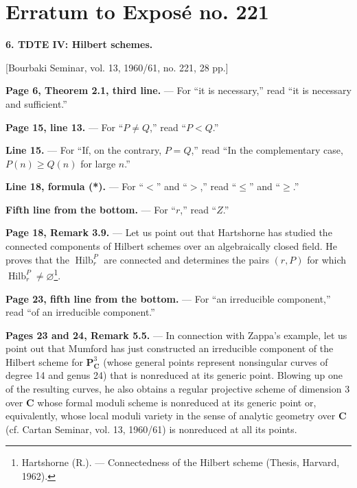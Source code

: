 \clearpage
\chapter*{Erratum to Exposé no. 221}
\setcounter{footnote}{3}

\noindent\textbf{6. TDTE IV: Hilbert schemes.}

\begin{center}
[Bourbaki Seminar, vol. 13, 1960/61, no. 221, 28 pp.]
\end{center}

\noindent\textbf{Page 6, Theorem 2.1, third line.} --- For “it is necessary,”
read “it is necessary and sufficient.”

\noindent\textbf{Page 15, line 13.} --- For “$P\neq Q$,” read “$P<Q$.”

\noindent\textbf{Line 15.} --- For “If, on the contrary, $P=Q$,” read “In
the complementary case, $P(n)\geq Q(n)$ for large $n$.”

\noindent\textbf{Line 18, formula (*).} --- For “$<$” and “$>$,” read
“$\leq$” and “$\geq$.”

\noindent\textbf{Fifth line from the bottom.} --- For “$r$,” read “$Z$.”

\noindent\textbf{Page 18, Remark 3.9.} --- Let us point out that Hartshorne
has studied the connected components of Hilbert schemes over an algebraically
closed field. He proves that the $\operatorname{Hilb}^{P}_{r}$ are connected
and determines the pairs $(r,P)$ for which
$\operatorname{Hilb}^{P}_{r}\neq\varnothing$\footnote{Hartshorne (R.). ---
Connectedness of the Hilbert scheme (Thesis, Harvard, 1962).}.

\noindent\textbf{Page 23, fifth line from the bottom.} --- For “an
irreducible component,” read “of an irreducible component.”

\noindent\textbf{Pages 23 and 24, Remark 5.5.} --- In connection with Zappa's
example, let us point out that Mumford has just constructed an irreducible
component of the Hilbert scheme for $\mathbf P^3_{\mathbf C}$ (whose general
points represent nonsingular curves of degree 14 and genus 24) that is
nonreduced at its generic point. Blowing up one of the resulting curves, he
also obtains a regular projective scheme of dimension 3 over $\mathbf C$ whose
formal moduli scheme is nonreduced at its generic point or, equivalently,
whose local moduli variety in the sense of analytic geometry over $\mathbf C$
(cf. Cartan Seminar, vol. 13, 1960/61) is nonreduced at all its points.
